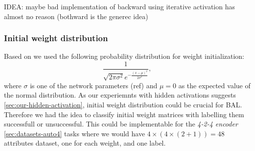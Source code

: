 IDEA: maybe bad implementation of backward
      using iterative activation has almost no reason (bothward is the generec idea) 

\subsubsection*{Initial weight distribution} 
\label{sec:results-sigma} %
\label{sec:our-sigma} 

Based on \citet{o1996bio} we used the following probability distribution for weight initialization: 
\begin{equation} 
\frac{1}{\sqrt{2\pi \sigma^2} e^{-\frac{(x-\mu)^2}{2\sigma^2}}} \nonumber,
\end{equation} 
where $\sigma$ is one of the network parameters (ref) and $\mu = 0$ as the expected value of the normal distribution. As our experiemnts with hidden activations suggests \ref{sec:our-hidden-activation}, initial weight distribution could be crucial for BAL. Therefore we had the idea to classify initial weight matrices with labelling them successfull or unsuccessful. This could be implementable for the \emph{4-2-4 encoder} \ref{sec:datasets-auto4} tasks where we would have $4\times(4\times(2+1))=48$ attributes dataset, one for each weight, and one label.

